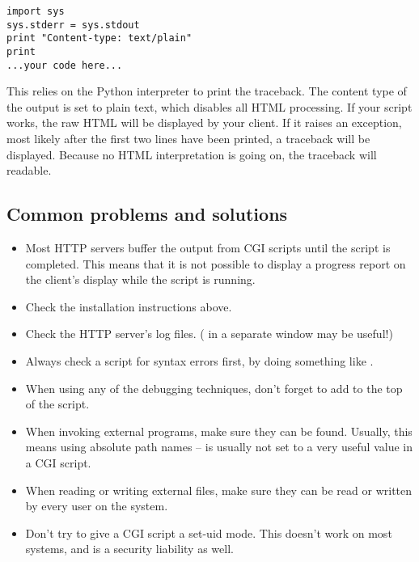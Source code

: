 \bcode\begin{verbatim}
import sys
sys.stderr = sys.stdout
print "Content-type: text/plain"
print
...your code here...
\end{verbatim}\ecode
%
This relies on the Python interpreter to print the traceback.  The
content type of the output is set to plain text, which disables all
HTML processing.  If your script works, the raw HTML will be displayed
by your client.  If it raises an exception, most likely after the
first two lines have been printed, a traceback will be displayed.
Because no HTML interpretation is going on, the traceback will
readable.


\subsection{Common problems and solutions}

\begin{itemize}
\item Most HTTP servers buffer the output from CGI scripts until the
script is completed.  This means that it is not possible to display a
progress report on the client's display while the script is running.

\item Check the installation instructions above.

\item Check the HTTP server's log files.  ( in a separate
window may be useful!)

\item Always check a script for syntax errors first, by doing something
like .

\item When using any of the debugging techniques, don't forget to add
 to the top of the script.

\item When invoking external programs, make sure they can be found.
Usually, this means using absolute path names --  is usually not
set to a very useful value in a CGI script.

\item When reading or writing external files, make sure they can be read
or written by every user on the system.

\item Don't try to give a CGI script a set-uid mode.  This doesn't work on
most systems, and is a security liability as well.
\end{itemize}

